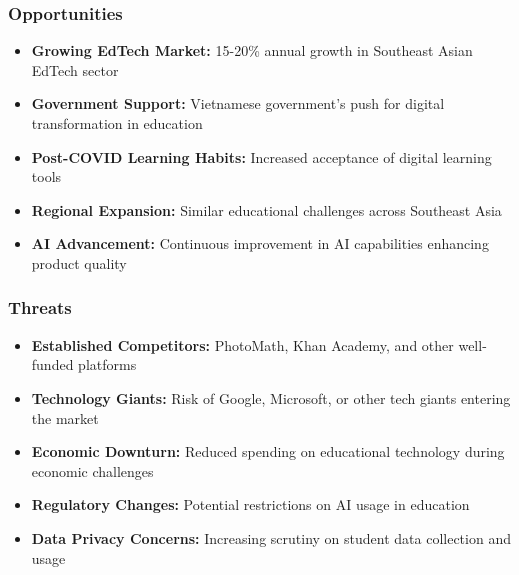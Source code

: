 \subsubsection{Opportunities}
\begin{itemize}
    \item \textbf{Growing EdTech Market:} 15-20\% annual growth in Southeast Asian EdTech sector
    \item \textbf{Government Support:} Vietnamese government's push for digital transformation in education
    \item \textbf{Post-COVID Learning Habits:} Increased acceptance of digital learning tools
    \item \textbf{Regional Expansion:} Similar educational challenges across Southeast Asia
    \item \textbf{AI Advancement:} Continuous improvement in AI capabilities enhancing product quality
\end{itemize}

\subsubsection{Threats}
\begin{itemize}
    \item \textbf{Established Competitors:} PhotoMath, Khan Academy, and other well-funded platforms
    \item \textbf{Technology Giants:} Risk of Google, Microsoft, or other tech giants entering the market
    \item \textbf{Economic Downturn:} Reduced spending on educational technology during economic challenges
    \item \textbf{Regulatory Changes:} Potential restrictions on AI usage in education
    \item \textbf{Data Privacy Concerns:} Increasing scrutiny on student data collection and usage
\end{itemize}